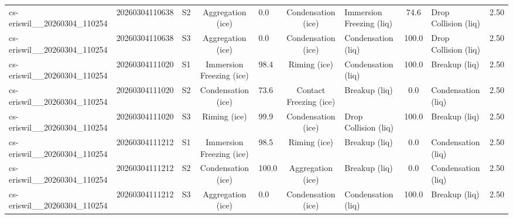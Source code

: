 \begin{table}[t]
{\begin{tabular}{lrlclclclc}
cs-eriswil\_\_20260304\_110254 & 20260304110638 & S2 & Aggregation (ice) & 0.0 & Condensation (ice) & Immersion Freezing (liq) & 74.6 & Drop Collision (liq) & 2.50 \\
cs-eriswil\_\_20260304\_110254 & 20260304110638 & S3 & Aggregation (ice) & 0.0 & Condensation (ice) & Condensation (liq) & 100.0 & Drop Collision (liq) & 2.50 \\
cs-eriswil\_\_20260304\_110254 & 20260304111020 & S1 & Immersion Freezing (ice) & 98.4 & Riming (ice) & Condensation (liq) & 100.0 & Breakup (liq) & 2.50 \\
cs-eriswil\_\_20260304\_110254 & 20260304111020 & S2 & Condensation (ice) & 73.6 & Contact Freezing (ice) & Breakup (liq) & 0.0 & Condensation (liq) & 2.50 \\
cs-eriswil\_\_20260304\_110254 & 20260304111020 & S3 & Riming (ice) & 99.9 & Condensation (ice) & Drop Collision (liq) & 100.0 & Breakup (liq) & 2.50 \\
cs-eriswil\_\_20260304\_110254 & 20260304111212 & S1 & Immersion Freezing (ice) & 98.5 & Riming (ice) & Breakup (liq) & 0.0 & Condensation (liq) & 2.50 \\
cs-eriswil\_\_20260304\_110254 & 20260304111212 & S2 & Condensation (ice) & 100.0 & Aggregation (ice) & Breakup (liq) & 0.0 & Condensation (liq) & 2.50 \\
cs-eriswil\_\_20260304\_110254 & 20260304111212 & S3 & Aggregation (ice) & 0.0 & Condensation (ice) & Condensation (liq) & 100.0 & Breakup (liq) & 2.50 \\
\hline
\end{tabular}
}
\end{table}
